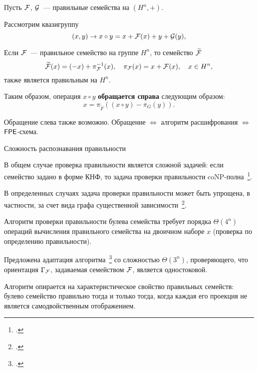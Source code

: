 \begin{frame}
    \begin{coloritemize}
        \item Пусть $\mathcal{F}$, $\mathcal{G}$~--- правильные семейства на $(H^n, +)$.
        \pause 
        \item Рассмотрим квазигруппу 
        \[
            (x, y) \to x \circ y = x + \mathcal{F}(x) + y + \mathcal{G}(y),
        \]
        \pause
        \item Если $\mathcal{F}$~--- правильное семейство на группе $H^n$, то семейство $\widetilde{\mathcal{F}}$
        \[
            \widetilde{\mathcal{F}}(x) = (-x) + \pi^{-1}_{\mathcal{F}}(x), \quad \pi_{\mathcal{F}}(x) = x + \mathcal{F}(x), \quad x \in H^n,
        \]
        также является правильным на $H^n$.
        \pause
        \item Таким образом, операция $x \circ y$ \textbf{обращается справа} следующим образом:
        \[
            x = \pi_{\widetilde{F}} \left( (x \circ y) - \pi_G(y) \right).
        \]
        \pause 
        \item Обращение слева также возможно.
        \pause 
        Обращение $\Leftrightarrow$ алгоритм расшифрования $\Leftrightarrow$ $\mathsf{FPE}$-схема.
    \end{coloritemize}
\end{frame}


\begin{frame}{Сложность распознавания правильности}
    \begin{coloritemize}
        \item В общем случае проверка правильности является сложной задачей: если семейство задано в форме КНФ, то задача проверки правильности coNP-полна~\footcite{nosov98}.
        \pause 
        \item В определенных случаях задача проверки правильности может быть упрощена, в частности, за счет вида графа существенной зависимости~\footcite{rykov14}.
        \pause 
        \item Алгоритм проверки правильности булева семейства требует порядка $\Theta(4^n)$ операций вычисления правильного семейства на двоичном наборе $x$ (проверка по определению правильности).
        \pause 
        \item Предложена адаптация алгоритма~\footcite{bosshard2017pseudo} со сложностью $\Theta(3^n)$, проверяющего, что ориентация $\Gamma_{\mathcal{F}}$, задаваемая семейством $\mathcal{F}$, является одностоковой.
        \pause 
        \item Алгоритм опирается на характеристическое свойство правильных семейств: булево семейство правильно тогда и только тогда, когда каждая его проекция не является самодвойственным отображением.
    \end{coloritemize}
\end{frame}


